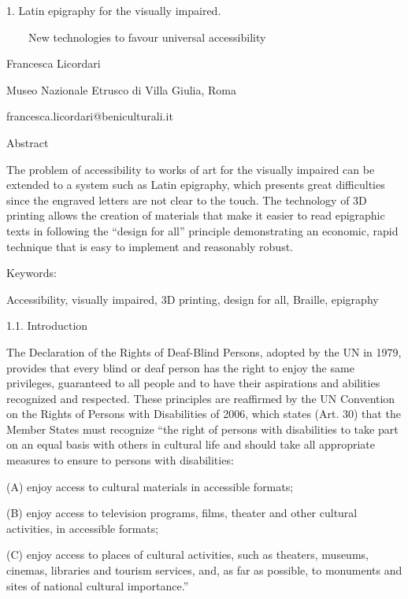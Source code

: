 \documentclass[amsthm,ebook]{saparticle}
\title{}
\author{Francesca Licordari}
\date{2015-11-19}
\begin{document}
1. Latin epigraphy for the visually impaired.

\ \ \ \ New technologies to favour universal accessibility


\bigskip

Francesca Licordari

Museo Nazionale Etrusco di Villa Giulia, Roma

francesca.licordari@beniculturali.it


\bigskip

Abstract


\bigskip

The problem of accessibility to works of art for the visually impaired can be extended to a system such as Latin
epigraphy, which presents great difficulties since the engraved letters are not clear to the touch. The technology of
3D printing allows the creation of materials that make it easier to read epigraphic texts in following the “design for
all” principle demonstrating an economic, rapid technique that is easy to implement and reasonably robust.


\bigskip

Keywords:


\bigskip

Accessibility, visually impaired, 3D printing, design for all, Braille, epigraphy


\bigskip

1.1. Introduction


\bigskip

The Declaration of the Rights of Deaf-Blind Persons, adopted by the UN in 1979, provides that every blind or deaf person
has the right to enjoy the same privileges, guaranteed to all people and to have their aspirations and abilities
recognized and respected. These principles are reaffirmed by the UN Convention on the Rights of Persons with
Disabilities of 2006, which states (Art. 30) that the Member States must recognize “the right of persons with
disabilities to take part on an equal basis with others in cultural life and should take all appropriate measures to
ensure to persons with disabilities:

(A) enjoy access to cultural materials in accessible formats;

(B) enjoy access to television programs, films, theater and other cultural activities, in accessible formats;

(C) enjoy access to places of cultural activities, such as theaters, museums, cinemas, libraries and tourism services,
and, as far as possible, to monuments and sites of national cultural importance.”
\end{document}
